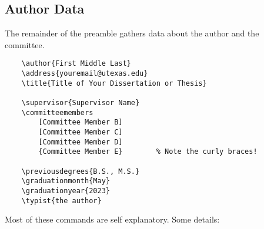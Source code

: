 \subsection{Author Data} %

The remainder of the preamble gathers data about the author and the committee.
\begin{verbatim}
    \author{First Middle Last}
    \address{youremail@utexas.edu}
    \title{Title of Your Dissertation or Thesis}

    \supervisor{Supervisor Name}
    \committeemembers
        [Committee Member B]
        [Committee Member C]
        [Committee Member D]
        {Committee Member E}        % Note the curly braces!

    \previousdegrees{B.S., M.S.}
    \graduationmonth{May}
    \graduationyear{2023}
    \typist{the author}
\end{verbatim}
Most of these commands are self explanatory.
Some details:

